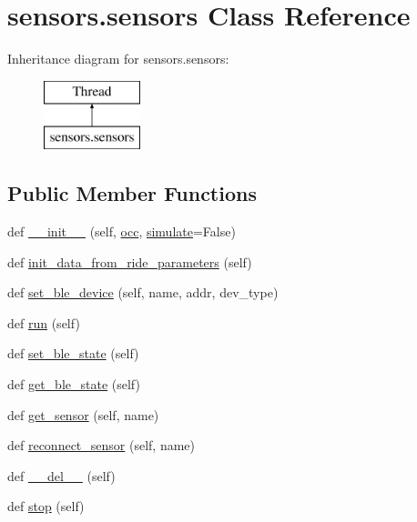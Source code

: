 \hypertarget{classsensors_1_1sensors}{}\section{sensors.\+sensors Class Reference}
\label{classsensors_1_1sensors}
Inheritance diagram for sensors.\+sensors\+:\begin{figure}[H]
\begin{center}
\leavevmode
\includegraphics[height=2.000000cm]{classsensors_1_1sensors}
\end{center}
\end{figure}
\subsection*{Public Member Functions}
\begin{DoxyCompactItemize}
\item 
def \hyperlink{classsensors_1_1sensors_a88254be26dbf3f0c08e5619d2346c7ad}{\+\_\+\+\_\+init\+\_\+\+\_\+} (self, \hyperlink{classsensors_1_1sensors_a5bf11f0a0e2c85ca71f0c6b8315fe52e}{occ}, \hyperlink{classsensors_1_1sensors_a8eba6f72ffd7bafc1175d34212538646}{simulate}=False)
\item 
def \hyperlink{classsensors_1_1sensors_ac87befb2007bc2dc41183dd0f1bbf6fe}{init\+\_\+data\+\_\+from\+\_\+ride\+\_\+parameters} (self)
\item 
def \hyperlink{classsensors_1_1sensors_a5406a0c10ade1fca453cd70fb9e00ce3}{set\+\_\+ble\+\_\+device} (self, name, addr, dev\+\_\+type)
\item 
def \hyperlink{classsensors_1_1sensors_a7b076fab9aa6e370634f2c6833ee881a}{run} (self)
\item 
def \hyperlink{classsensors_1_1sensors_a8b62d241d6058127c7ffeea793ec4955}{set\+\_\+ble\+\_\+state} (self)
\item 
def \hyperlink{classsensors_1_1sensors_a5a7afd3c753b0e541a67f6c3f30eec2b}{get\+\_\+ble\+\_\+state} (self)
\item 
def \hyperlink{classsensors_1_1sensors_a36ff18450cb69c6b3bbcedf4aca05d0b}{get\+\_\+sensor} (self, name)
\item 
def \hyperlink{classsensors_1_1sensors_a7a53d09d9f55404f99601ac72e26e0ce}{reconnect\+\_\+sensor} (self, name)
\item 
def \hyperlink{classsensors_1_1sensors_a34571845bad702f6cb4a40100cb7df13}{\+\_\+\+\_\+del\+\_\+\+\_\+} (self)
\item 
def \hyperlink{classsensors_1_1sensors_afda843e462ec89881fbebcd6b636cc00}{stop} (self)
\end{DoxyCompactItemize}
